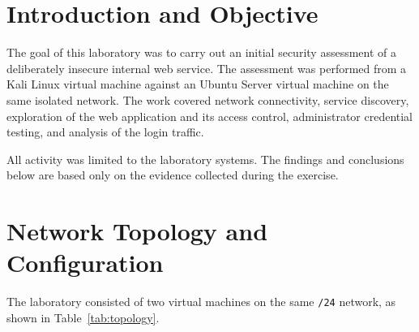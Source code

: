 



\section{Introduction and Objective}

The goal of this laboratory was to carry out an initial security assessment of
a deliberately insecure internal web service. The assessment was performed from
a Kali Linux virtual machine against an Ubuntu Server virtual machine on the
same isolated network. The work covered network connectivity, service
discovery, exploration of the web application and its access control,
administrator credential testing, and analysis of the login traffic.

All activity was limited to the laboratory systems. The findings and
conclusions below are based only on the evidence collected during the exercise.

\section{Network Topology and Configuration}

The laboratory consisted of two virtual machines on the same \texttt{/24}
network, as shown in Table~\ref{tab:topology}.

